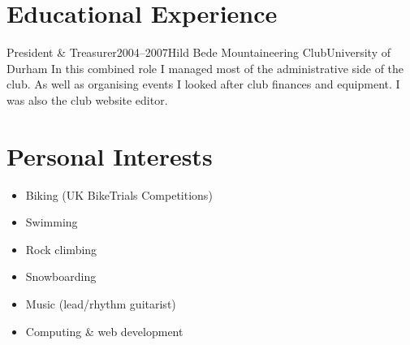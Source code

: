\documentclass{cv}
\begin{document}
\section{Educational Experience}

\begin{experience}{President \& Treasurer}{2004--2007}{Hild Bede Mountaineering Club}{University of Durham}
In this combined role I managed most of the administrative side of the club. As well as organising events I looked after club finances and equipment. I was also the club website editor.
\end{experience}

\section{Personal Interests}

\begin{itemize}
\item Biking (UK BikeTrials Competitions)
\item Swimming
\item Rock climbing
\item Snowboarding
\item Music (lead/rhythm guitarist)
\item Computing \& web development
\end{itemize}
\end{document}
